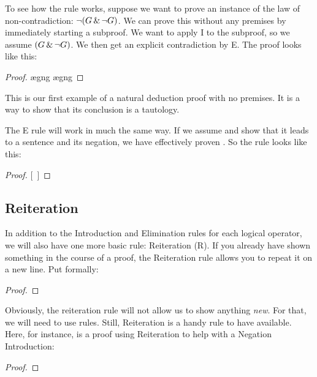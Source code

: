 To see how the rule works, suppose we want to prove an instance of the law of non-contradiction: $\neg(G \,\&\, \neg G)$. We can prove this without any premises by immediately starting a subproof. We want to apply {\enot}I to the subproof, so we assume $(G \,\&\, \neg G)$. We then get an explicit contradiction by {\eand}E. The proof looks like this:

\begin{proof}
	\open
		\ae{gng}
		\ae{gng}
	\close
\end{proof}

This is our first example of a natural deduction proof with no premises. It is a way to show that its conclusion is a tautology.

The {\enot}E rule will work in much the same way. If we assume \enot\metaA{} and show that it leads to a sentence and its negation, we have effectively proven \metaA{}. So the rule looks like this:

\begin{proof}
\open
	\metaB{}
\close
{}[\ ]\metaA{}
\end{proof}

\subsection{Reiteration}
\label{sec:reiteration}

In addition to the Introduction and Elimination rules for each logical operator, we will also have one more basic rule: Reiteration (R). If you already have shown something in the course of a proof, the Reiteration rule allows you to repeat it on a new line. Put formally:

\begin{proof}
	\metaA{}
	\metaA{} 
\end{proof}

Obviously, the reiteration rule will not allow us to show anything \emph{new}. For that, we will need to use rules. Still, Reiteration is a handy rule to have available. Here, for instance, is a proof using Reiteration to help with a Negation Introduction:

\begin{proof}
	 
	\open
		 
	\close
\end{proof}

